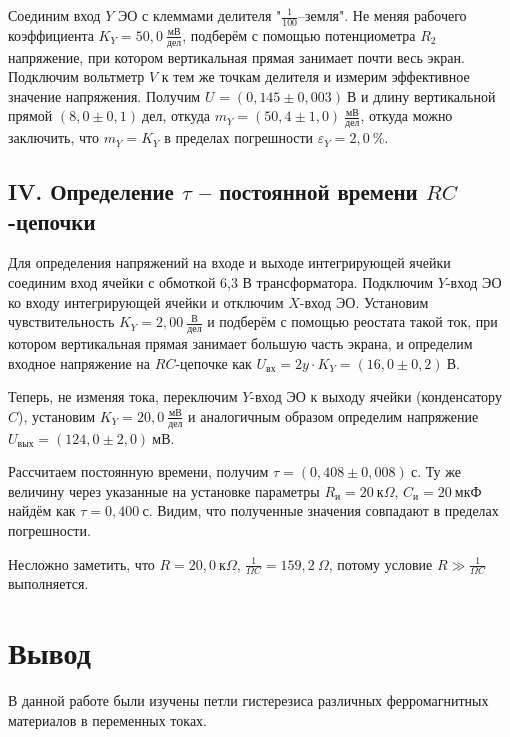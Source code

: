\documentclass[a4paper, 12pt]{article}
\begin{document}
Соединим вход $Y$ ЭО с клеммами делителя "$\frac{1}{100}$--земля". Не меняя рабочего коэффициента $K_Y=50,0~\frac{\text{мВ}}{\text{дел}}$, подберём с помощью потенциометра $R_2$ напряжение, при котором вертикальная прямая занимает почти весь экран. Подключим вольтметр $V$ к тем же точкам делителя и измерим эффективное значение напряжения. Получим $U_{\text{}}=\left(0,145\pm0,003\right)~\text{В}$ и длину вертикальной прямой $\left(8,0\pm0,1\right)~\text{дел}$, откуда $m_Y=\left(50,4\pm1,0\right)~\frac{\text{мВ}}{\text{дел}}$, откуда можно заключить, что $m_Y=K_Y$ в пределах погрешности $\varepsilon_Y=2,0~\%$.

\subsection*{IV. Определение $\tau$ -- постоянной времени $RC$-цепочки}

Для определения напряжений на входе и выходе интегрирующей ячейки соединим вход ячейки с обмоткой 6,3 В трансформатора. Подключим $Y$-вход ЭО ко входу интегрирующей ячейки и отключим $X$-вход ЭО. Установим чувствительность $K_Y=2,00~\frac{\text{В}}{\text{дел}}$ и подберём с помощью реостата такой ток, при котором вертикальная прямая занимает большую часть экрана, и определим входное напряжение на $RC$-цепочке как $U_{\text{вх}}=2y\cdot K_Y=\left(16,0\pm0,2\right)~\text{В}$.

Теперь, не изменяя тока, переключим $Y$-вход ЭО к выходу ячейки (конденсатору $C$), установим $K_Y=20,0~\frac{\text{мВ}}{\text{дел}}$ и аналогичным образом определим напряжение $U_{\text{вых}}=\left(124,0\pm2,0\right)~\text{мВ}$.

Рассчитаем постоянную времени, получим $\tau=\left(0,408\pm0,008\right)~\text{с}$. Ту же величину через указанные на установке параметры $R_{\text{и}}=20~\text{к$\Omega$}$, $C_{\text{и}}=20~\text{мкФ}$ найдём как $\tau=0,400~\text{с}$. Видим, что полученные значения совпадают в пределах погрешности.

Несложно заметить, что $R=20,0~\text{к$\Omega$}$, $\frac{1}{\Omega C}=159,2~\Omega$, потому условие $R\gg\frac{1}{\Omega C}$ выполняется.

\section*{Вывод}

В данной работе были изучены петли гистерезиса различных ферромагнитных материалов в переменных токах.
\end{document}
